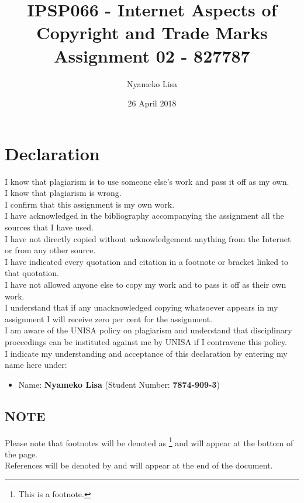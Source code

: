 \documentclass[11pt]{article}
\author{Nyameko Lisa}
\date{26 April 2018}
\title{IPSP066 - Internet Aspects of Copyright and Trade Marks\\\medskip
\large Assignment 02 - 827787}
\begin{document}
\maketitle
\addvspace{110pt}

\justifying
\addvspace{110pt}
\section*{Declaration}
\label{sec:org10e74a3}
I know that plagiarism is to use someone else’s work and pass it off as my own.\\
I know that plagiarism is wrong.\\
I confirm that this assignment is my own work.\\
I have acknowledged in the bibliography accompanying the assignment all the sources that I have used.\\
I have not directly copied without acknowledgement anything from the Internet or from any other source.\\
I have indicated every quotation and citation in a footnote or bracket linked to that quotation.\\
I have not allowed anyone else to copy my work and to pass it off as their own work.\\
I understand that if any unacknowledged copying whatsoever appears in my assignment I will receive zero per cent for the assignment.\\
I am aware of the UNISA policy on plagiarism and understand that disciplinary proceedings can be instituted against me by UNISA if I contravene this policy.\\
I indicate my understanding and acceptance of this declaration by
entering my name here under:
\begin{itemize}
\item Name: \textbf{Nyameko Lisa} (Student Number: \textbf{7874-909-3})
\end{itemize}

\subsection*{NOTE}
\label{sec:org54d6bfa}
Please note that footnotes will be denoted as \footnote{This is a footnote.} and will
appear at the bottom of the page.\\
References will be denoted by \cite{rsa78_copyrightact} and will appear at the end of the document.
\newpage
\end{document}
